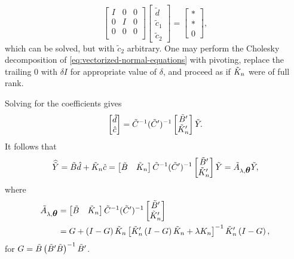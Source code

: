 \begin{equation} \label{eq:vectorized-normal-equations-cholesky-2}
\begin{bmatrix}
I & 0 & 0\\
0 & I & 0 \\
0 & 0 & 0 \\
\end{bmatrix}
\begin{bmatrix}
\tilde{d}\\
\tilde{c}_1\\
\tilde{c}_2
\end{bmatrix}
= \begin{bmatrix}
* \\
* \\
0
\end{bmatrix},
\end{equation}
\noindent
which can be solved, but with $\tilde{c}_2$ arbitrary. One may perform the Cholesky decomposition of \eqref{eq:vectorized-normal-equations} with pivoting, replace the trailing $0$ with $\delta I$ for appropriate value of $\delta$, and proceed as if $\tilde{K}_n$ were of full rank. 

\bigskip


Solving for the coefficients gives
\begin{equation} \label{eq:d-c-hat}
\begin{bmatrix} \hat{d} \\ \hat{c} \end{bmatrix} = \tilde{C}^{-1} (\tilde{C}')^{-1} \begin{bmatrix} \tilde{B}' \\ \tilde{K}_n' \end{bmatrix} \tilde{Y}. 
\end{equation} 
\noindent
It follows that
\begin{equation} \label{eq:tildeY-hat-equals-tildeA-tildeY}
\widehat{\tilde{Y}} = \tilde{B} \hat{d} + \tilde{K}_n \hat{c} = \begin{bmatrix} \tilde{B} & \tilde{K}_n \end{bmatrix} \tilde{C}^{-1} (\tilde{C}')^{-1} \begin{bmatrix} \tilde{B}' \\ \tilde{K}_n' \end{bmatrix} \tilde{Y} = \tilde{A}_{\lambda,\mbox{\boldmath $\theta$}} \tilde{Y},
\end{equation} 
\noindent
where
\begin{align}
\begin{split} \label{eq:smoothing-matrix-A-tilde}
\tilde{A}_{\lambda,\mbox{\boldmath $\theta$}} &= \begin{bmatrix} \tilde{B} & \tilde{K}_n \end{bmatrix} \tilde{C}^{-1} (\tilde{C}')^{-1} \begin{bmatrix} \tilde{B}' \\ \tilde{K}_n' \end{bmatrix}  \\
&= G + \left(I - G\right) \tilde{K}_n \left[\tilde{K}_n'\left( I - G \right)\tilde{K}_n + \lambda K_n\right]^{-1} \tilde{K}_n'\left(I - G\right),
\end{split}
\end{align} 
\noindent
for $G = \tilde{B}\left(\tilde{B}' \tilde{B} \right)^{-1}\tilde{B}'$.


